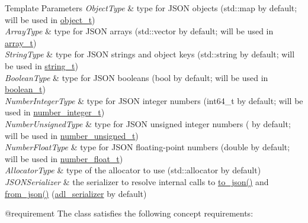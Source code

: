 \begin{DoxyTemplParams}{Template Parameters}
{\em Object\+Type} & type for J\+S\+ON objects ({\ttfamily std\+::map} by default; will be used in \mbox{\hyperlink{classnlohmann_1_1basic__json_aa1eb13d5aa86f80cbee6c58e90fbaf49}{object\+\_\+t}}) \\
\hline
{\em Array\+Type} & type for J\+S\+ON arrays ({\ttfamily std\+::vector} by default; will be used in \mbox{\hyperlink{classnlohmann_1_1basic__json_ae095578e03df97c5b3991787f1056374}{array\+\_\+t}}) \\
\hline
{\em String\+Type} & type for J\+S\+ON strings and object keys ({\ttfamily std\+::string} by default; will be used in \mbox{\hyperlink{classnlohmann_1_1basic__json_a61f8566a1a85a424c7266fb531dca005}{string\+\_\+t}}) \\
\hline
{\em Boolean\+Type} & type for J\+S\+ON booleans ({\ttfamily bool} by default; will be used in \mbox{\hyperlink{classnlohmann_1_1basic__json_a4c919102a9b4fe0d588af64801436082}{boolean\+\_\+t}}) \\
\hline
{\em Number\+Integer\+Type} & type for J\+S\+ON integer numbers ({\ttfamily int64\+\_\+t} by default; will be used in \mbox{\hyperlink{classnlohmann_1_1basic__json_a98e611d67b7bd75307de99c9358ab2dc}{number\+\_\+integer\+\_\+t}}) \\
\hline
{\em Number\+Unsigned\+Type} & type for J\+S\+ON unsigned integer numbers ({} by default; will be used in \mbox{\hyperlink{classnlohmann_1_1basic__json_ab906e29b5d83ac162e823ada2156b989}{number\+\_\+unsigned\+\_\+t}}) \\
\hline
{\em Number\+Float\+Type} & type for J\+S\+ON floating-\/point numbers ({\ttfamily double} by default; will be used in \mbox{\hyperlink{classnlohmann_1_1basic__json_a88d6103cb3620410b35200ee8e313d97}{number\+\_\+float\+\_\+t}}) \\
\hline
{\em Allocator\+Type} & type of the allocator to use ({\ttfamily std\+::allocator} by default) \\
\hline
{\em J\+S\+O\+N\+Serializer} & the serializer to resolve internal calls to {\ttfamily \mbox{\hyperlink{namespacenlohmann_1_1detail_a6fa2f784014bfc0b62d7a35d51e676c9}{to\+\_\+json()}}} and {\ttfamily \mbox{\hyperlink{namespacenlohmann_1_1detail_a839b0ab50d2c9bce669068f56bc41202}{from\+\_\+json()}}} (\mbox{\hyperlink{structnlohmann_1_1adl__serializer}{adl\+\_\+serializer}} by default)\\
\hline
\end{DoxyTemplParams}
@requirement The class satisfies the following concept requirements\+:
